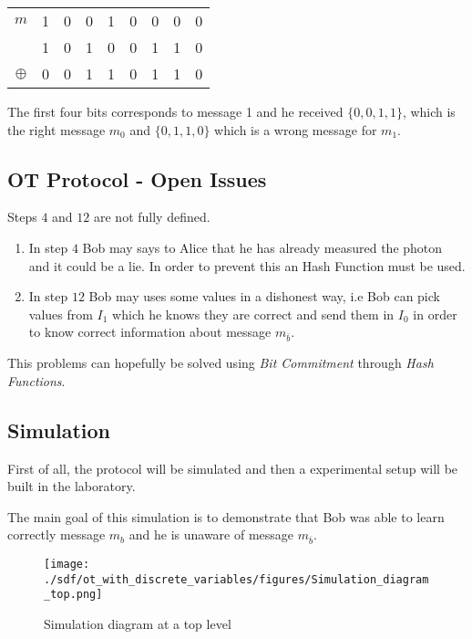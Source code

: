 \begin{enumerate}
      \begin{table}[H]
        \centering
        \begin{tabular}{c|c c c c c c c c}
         $m$ & 1 & 0 & 0 & 1 & 0 & 0 & 0 & 0 \\
             & 1 & 0 & 1 & 0 & 0 & 1 & 1 & 0 \\ \hline
         $\oplus$ & 0 & 0 & 1 & 1 & 0 & 1 & 1 & 0 \\
        \end{tabular}
        \end{table}

      The first four bits corresponds to message 1 and he received $\{0,0,1,1\}$, which is the right message $m_{0}$ and $\{0,1,1,0\}$ which is a wrong message for $m_{1}$.


\end{enumerate}

\subsection{OT Protocol - Open Issues}
Steps $4$ and $12$ are not fully defined.
\begin{enumerate}
  \item In step $4$ Bob may says to Alice that he has already measured the photon and it could be a lie. In order to prevent this an Hash Function must be used.

  \item In step $12$ Bob may uses some values in a dishonest way, i.e Bob can pick values from $I_{1}$ which he knows they are correct and send them in $I_{0}$ in order to know correct information about message $m_{\bar{b}}$.
\end{enumerate}

This problems can hopefully be solved using \textit{Bit Commitment} through \textit{Hash Functions}.


\subsection{Simulation}

First of all, the protocol will be simulated and then a experimental setup will be built in the laboratory.

The main goal of this simulation is to demonstrate that Bob was able to learn correctly message $m_{b}$ and he is unaware of message $m_{\overline{b}}$.

\begin{figure}[H]
	\centering
	\texttt{[image: ./sdf/ot\_with\_discrete\_variables/figures/Simulation\_diagram\_top.png]}
	\caption{Simulation diagram at a top level}\label{toplevelsimulation}
\end{figure}

